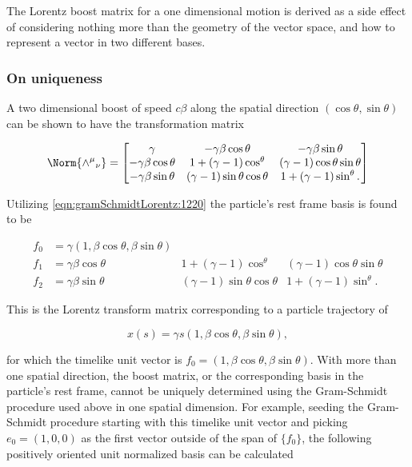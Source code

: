 The Lorentz boost matrix for a one dimensional motion is derived as a side effect of considering nothing more than the geometry of the vector space, and how to represent a vector in two different bases.

\subsubsection{On uniqueness}

A two dimensional boost of speed $c \beta$ along the spatial direction $(\cos\theta, \sin\theta)$ can be shown to have the transformation matrix

\begin{equation}\label{eqn:gramSchmidtLorentz:n}
\Norm{ {\wedge^\mu}_\nu }
=
\begin{bmatrix}
\gamma & -\gamma \beta \cos\theta & -\gamma \beta \sin\theta \\
-\gamma \beta \cos\theta & 1 + (\gamma -1) \cos^\theta & (\gamma -1) \cos\theta \sin\theta \\
-\gamma \beta \sin\theta & (\gamma -1) \sin\theta \cos\theta & 1 + (\gamma -1) \sin^\theta.
\end{bmatrix}
\end{equation}

Utilizing \ref{eqn:gramSchmidtLorentz:1220} the particle's rest frame basis is found to be

\begin{align}\label{eqn:gramSchmidtLorentz:n}
f_0 &= \gamma ( 1, \beta \cos\theta, \beta\sin\theta ) \\
f_1 &= \gamma \beta \cos\theta & 1 + (\gamma -1) \cos^\theta & (\gamma -1) \cos\theta \sin\theta \\
f_2 &= \gamma \beta \sin\theta & (\gamma -1) \sin\theta \cos\theta & 1 + (\gamma -1) \sin^\theta.
\end{align}

This is the Lorentz transform matrix corresponding to a particle trajectory of

\begin{equation}\label{eqn:gramSchmidtLorentz:800}
x(s) = \gamma s ( 1, \beta \cos\theta, \beta \sin\theta),
\end{equation}

for which the timelike unit vector is $f_0 = ( 1, \beta \cos\theta, \beta \sin\theta )$.  With more than one spatial direction, the boost matrix, or the corresponding basis in the particle's rest frame, cannot be uniquely determined using the Gram-Schmidt procedure used above in one spatial dimension.  For example, seeding the Gram-Schmidt procedure starting with this timelike unit vector and picking $e_0 = (1, 0, 0)$ as the first vector outside of the span of $\{f_0\}$, the following positively oriented unit normalized basis can be calculated


